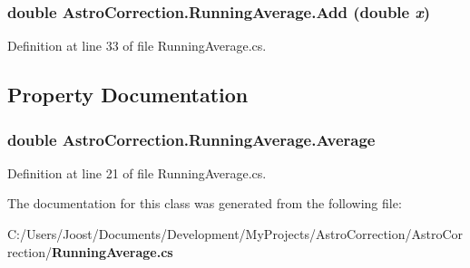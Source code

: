 \subsubsection[{Add}]{\setlength{\rightskip}{0pt plus 5cm}double AstroCorrection.RunningAverage.Add (double {\em x})}\label{class_astro_correction_1_1_running_average_acfcaf2ffa54301ff88aae527748efcec}


Definition at line 33 of file RunningAverage.cs.

\subsection{Property Documentation}
\subsubsection[{Average}]{\setlength{\rightskip}{0pt plus 5cm}double AstroCorrection.RunningAverage.Average\hspace{0.3cm}{\ttfamily  [get]}}\label{class_astro_correction_1_1_running_average_a0866748792b2f22fa72d35a06b407566}


Definition at line 21 of file RunningAverage.cs.

The documentation for this class was generated from the following file:\begin{DoxyCompactItemize}
\item 
C:/Users/Joost/Documents/Development/MyProjects/AstroCorrection/AstroCorrection/{\bf RunningAverage.cs}\end{DoxyCompactItemize}
